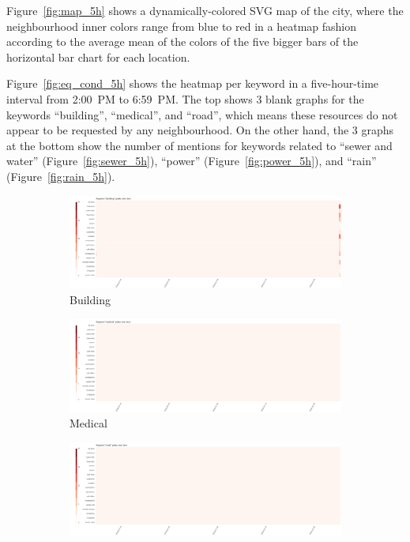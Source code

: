 Figure~\ref{fig:map_5h} shows a dynamically-colored SVG map of the city, where
the neighbourhood inner colors range from blue to red in a heatmap fashion
according to the average mean of the colors of the five bigger bars of the
horizontal bar chart for each location.

Figure~\ref{fig:eq_cond_5h} shows the heatmap per keyword in a five-hour-time 
interval from 2:00~PM to 6:59~PM. The top shows 3 blank graphs for the keywords
``building'', ``medical'', and ``road'', which means these resources do not 
appear to be requested by any neighbourhood. On the other hand, the 3 graphs at
the bottom show the number of mentions for keywords related to 
``sewer and water'' (Figure~\ref{fig:sewer_5h}), 
``power'' (Figure~\ref{fig:power_5h}), and ``rain'' (Figure~\ref{fig:rain_5h}). 

\begin{figure}[!h]
    \centering
    \begin{subfigure}[!h]{0.32\textwidth}
        \centering
        \includegraphics[width=1.00\textwidth]{figs/q1/cond_5h/cond_5h_build.png}
        \caption{Building}
        \label{fig:build_5h}
    \end{subfigure}
    \begin{subfigure}[!h]{0.32\textwidth}
        \centering
        \includegraphics[width=1.00\textwidth]{figs/q1/cond_5h/cond_5h_medical.png}
        \caption{Medical}
        \label{fig:medical_5h}
    \end{subfigure}
    \begin{subfigure}[!h]{0.32\textwidth}
        \centering
        \includegraphics[width=1.00\textwidth]{figs/q1/cond_5h/cond_5h_road.png}

\end{subfigure}
\end{figure}
